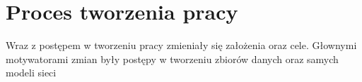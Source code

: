 
\chapter{Proces tworzenia pracy}

Wraz z postępem w tworzeniu pracy zmieniały się założenia oraz cele.
Głownymi motywatorami zmian były postępy w tworzeniu zbiorów danych oraz samych
modeli sieci
